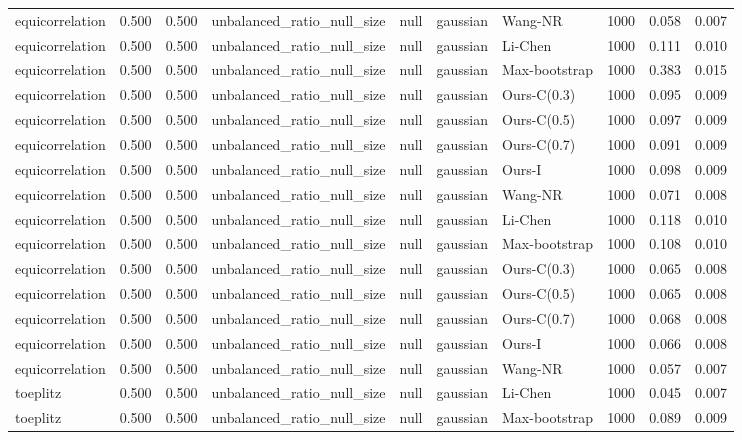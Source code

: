 \begin{tabular}{lrrllllrrr}
equicorrelation & 0.500 & 0.500 & unbalanced\_ratio\_null\_size & null & gaussian & Wang-NR & 1000 & 0.058 & 0.007 \\
equicorrelation & 0.500 & 0.500 & unbalanced\_ratio\_null\_size & null & gaussian & Li-Chen & 1000 & 0.111 & 0.010 \\
equicorrelation & 0.500 & 0.500 & unbalanced\_ratio\_null\_size & null & gaussian & Max-bootstrap & 1000 & 0.383 & 0.015 \\
equicorrelation & 0.500 & 0.500 & unbalanced\_ratio\_null\_size & null & gaussian & Ours-C(0.3) & 1000 & 0.095 & 0.009 \\
equicorrelation & 0.500 & 0.500 & unbalanced\_ratio\_null\_size & null & gaussian & Ours-C(0.5) & 1000 & 0.097 & 0.009 \\
equicorrelation & 0.500 & 0.500 & unbalanced\_ratio\_null\_size & null & gaussian & Ours-C(0.7) & 1000 & 0.091 & 0.009 \\
equicorrelation & 0.500 & 0.500 & unbalanced\_ratio\_null\_size & null & gaussian & Ours-I & 1000 & 0.098 & 0.009 \\
equicorrelation & 0.500 & 0.500 & unbalanced\_ratio\_null\_size & null & gaussian & Wang-NR & 1000 & 0.071 & 0.008 \\
equicorrelation & 0.500 & 0.500 & unbalanced\_ratio\_null\_size & null & gaussian & Li-Chen & 1000 & 0.118 & 0.010 \\
equicorrelation & 0.500 & 0.500 & unbalanced\_ratio\_null\_size & null & gaussian & Max-bootstrap & 1000 & 0.108 & 0.010 \\
equicorrelation & 0.500 & 0.500 & unbalanced\_ratio\_null\_size & null & gaussian & Ours-C(0.3) & 1000 & 0.065 & 0.008 \\
equicorrelation & 0.500 & 0.500 & unbalanced\_ratio\_null\_size & null & gaussian & Ours-C(0.5) & 1000 & 0.065 & 0.008 \\
equicorrelation & 0.500 & 0.500 & unbalanced\_ratio\_null\_size & null & gaussian & Ours-C(0.7) & 1000 & 0.068 & 0.008 \\
equicorrelation & 0.500 & 0.500 & unbalanced\_ratio\_null\_size & null & gaussian & Ours-I & 1000 & 0.066 & 0.008 \\
equicorrelation & 0.500 & 0.500 & unbalanced\_ratio\_null\_size & null & gaussian & Wang-NR & 1000 & 0.057 & 0.007 \\
toeplitz & 0.500 & 0.500 & unbalanced\_ratio\_null\_size & null & gaussian & Li-Chen & 1000 & 0.045 & 0.007 \\
toeplitz & 0.500 & 0.500 & unbalanced\_ratio\_null\_size & null & gaussian & Max-bootstrap & 1000 & 0.089 & 0.009 \\

\end{tabular}
